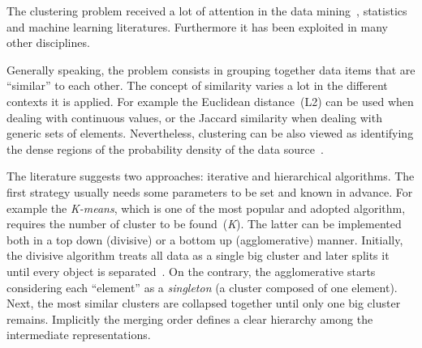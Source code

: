 The clustering problem received a lot of attention in the data mining~\cite{fayyad1996advances}, statistics~\cite{tijms1994stochastic,banfield1993model} and machine learning literatures. Furthermore it has been exploited in many other disciplines.

Generally speaking, the problem consists in grouping together data items that are ``similar'' to each other.
The concept of similarity varies a lot in the different contexts it is applied.
For example the Euclidean distance~(L2) can be used when dealing with continuous values, or the Jaccard similarity when dealing with generic sets of elements.
Nevertheless, clustering can be also viewed as identifying the dense regions of the probability density of the data source~\cite{bradley1998scaling}.

The literature suggests two approaches: iterative and hierarchical algorithms.
The first strategy usually needs some parameters to be set and known in advance.
For example the \emph{K-means}, which is one of the most popular and adopted algorithm,
requires the number of cluster to be found~(\emph{K}).
The latter can be implemented both in a top down (divisive) or a bottom up (agglomerative) manner.
Initially, the divisive algorithm treats all data as a single big cluster and later splits it until every object is separated~\cite{kaufman2009finding}.
On the contrary, the agglomerative starts considering each ``element'' as a \emph{singleton} (a cluster composed of one element).
Next, the most similar clusters are collapsed together until only one big cluster remains.
Implicitly the merging order defines a clear hierarchy among the intermediate representations.
